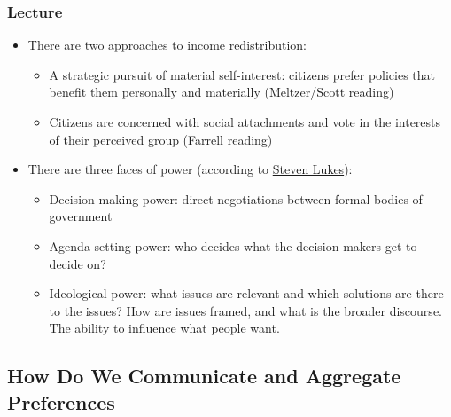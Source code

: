 \documentclass[11pt]{article}
\begin{document}
\subsubsection{Lecture}
\label{sec:orgfb67bee}
\begin{itemize}
\item There are two approaches to income redistribution:
\begin{itemize}
\item A strategic pursuit of material self-interest: citizens prefer policies that
benefit them personally and materially (Meltzer/Scott reading)
\item Citizens are concerned with social attachments and vote in the interests of
their perceived group (Farrell reading)
\end{itemize}
\item There are three faces of power (according to \href{20200716113623-steven\_lukes.org}{Steven Lukes}):
\begin{itemize}
\item Decision making power: direct negotiations between formal bodies of
government
\item Agenda-setting power: who decides what the decision makers get to decide on?
\item Ideological power: what issues are relevant and which solutions are there to
the issues? How are issues framed, and what is the broader discourse. The
ability to influence what people want.
\end{itemize}
\end{itemize}
\subsection{How Do We Communicate and Aggregate Preferences}
\label{sec:orgdf5ea02}
\end{document}
